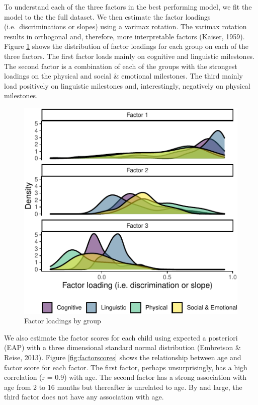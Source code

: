\documentclass[10pt, letterpaper]{article}
\newenvironment{CodeChunk}{}{}
\begin{document}
To understand each of the three factors in the best performing model, we
fit the model to the the full dataset. We then estimate the factor
loadings (i.e.~discriminations or slopes) using a varimax rotation. The
varimax rotation results in orthogonal and, therefore, more
interpretable factors (Kaiser, 1959). Figure \ref{fig:factorloadings}
shows the distribution of factor loadings for each group on each of the
three factors. The first factor loads mainly on cognitive and linguistic
milestones. The second factor is a combination of each of the groups
with the strongest loadings on the physical and social \& emotional
milestones. The third mainly load positively on linguistic milestones
and, interestingly, negatively on physical milestones.

\begin{CodeChunk}
\begin{figure}[tb]
\includegraphics{figs/factorloadings-1} \caption[Factor loadings by group]{Factor loadings by group}\label{fig:factorloadings}
\end{figure}
\end{CodeChunk}

We also estimate the factor scores for each child using expected a
posteriori (EAP) with a three dimensional standard normal distribution
(Embretson \& Reise, 2013). Figure \ref{fig:factorscores} shows the
relationship between age and factor score for each factor. The first
factor, perhaps unsurprisingly, has a high correlation (r = 0.9) with
age. The second factor has a strong association with age from 2 to 16
months but thereafter is unrelated to age. By and large, the third
factor does not have any association with age.
\end{document}
